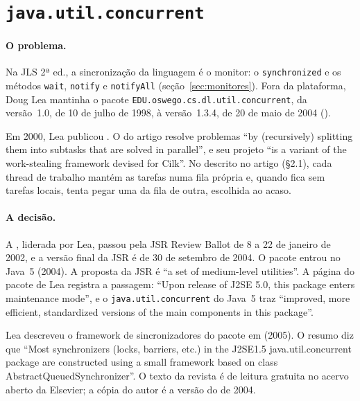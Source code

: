\section{\texttt{java.util.concurrent}}
\label{sec:juc}

\paragraph{O problema.}
Na JLS 2ª ed., a sincronização da linguagem é o monitor: o
\texttt{synchronized} e os métodos \texttt{wait}, \texttt{notify} e
\texttt{notifyAll} (seção~\ref{sec:monitores}). Fora da plataforma,
Doug Lea mantinha o pacote \texttt{EDU.oswego.cs.dl.util.concurrent},
da versão~1.0, de 10 de julho de 1998, à versão~1.3.4, de 20 de maio de
2004 ().

Em 2000, Lea publicou . O
 do artigo resolve problemas \enquote{by (recursively)
splitting them into subtasks that are solved in parallel}, e seu
projeto \enquote{is a variant of
the work-stealing framework devised for Cilk}. No
 descrito no artigo (§2.1), cada
thread de trabalho mantém as tarefas numa fila própria e, quando fica
sem tarefas locais, tenta pegar uma da fila de outra, escolhida ao
acaso.

\paragraph{A decisão.}
A , liderada por Lea, passou pela JSR Review
Ballot de 8 a 22 de janeiro de 2002, e a versão final da JSR é de 30 de
setembro de 2004. O pacote entrou no Java~5 (2004). A proposta da JSR é \enquote{a set of medium-level utilities}.
A página do pacote de Lea registra a passagem: \enquote{Upon release of
J2SE 5.0, this package enters maintenance mode}, e o
\texttt{java.util.concurrent} do Java~5 traz \enquote{improved, more
efficient, standardized versions of the main components in this
package}.

Lea descreveu o framework de sincronizadores do pacote em
 (2005). O resumo diz que
\enquote{Most synchronizers (locks, barriers, etc.) in the J2SE1.5
java.util.concurrent package are constructed using a small framework
based on class AbstractQueuedSynchronizer}. O texto da revista é de
leitura gratuita no acervo aberto da Elsevier; a cópia do autor é a
versão do  de 2004.

